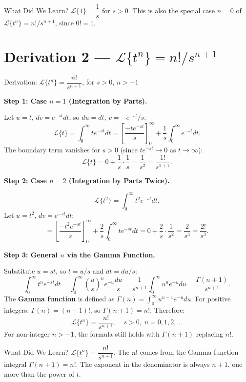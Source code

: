 \documentclass[12pt,a4paper]{article}
\begin{document}
\begin{learnbox}{What Did We Learn?}
$\mathcal{L}\{1\} = \dfrac{1}{s}$ for $s > 0$. This is also the special case $n = 0$ of
$\mathcal{L}\{t^n\} = n!/s^{n+1}$, since $0! = 1$.
\end{learnbox}

\section{Derivation 2 --- \texorpdfstring{$\mathcal{L}\{t^n\} = n!/s^{n+1}$}{L{tn}}}

\begin{infobox}{Derivation: $\mathcal{L}\{t^n\} = \dfrac{n!}{s^{n+1}}$, for $s > 0$, $n > -1$}

\textbf{Step 1: Case $n = 1$ (Integration by Parts).}

Let $u = t$, $dv = e^{-st} dt$, so $du = dt$, $v = -e^{-st}/s$:
\[
  \mathcal{L}\{t\} = \int_0^\infty t e^{-st} dt
  = \left[ \frac{-t e^{-st}}{s} \right]_0^\infty + \frac{1}{s}\int_0^\infty e^{-st} dt.
\]
The boundary term vanishes for $s > 0$ (since $t e^{-st} \to 0$ as $t \to \infty$):
\[
  \mathcal{L}\{t\} = 0 + \frac{1}{s} \cdot \frac{1}{s} = \frac{1}{s^2} = \frac{1!}{s^{1+1}}.
\]

\textbf{Step 2: Case $n = 2$ (Integration by Parts Twice).}

\[
  \mathcal{L}\{t^2\} = \int_0^\infty t^2 e^{-st} dt.
\]
Let $u = t^2$, $dv = e^{-st}dt$:
\[
  = \left[\frac{-t^2 e^{-st}}{s}\right]_0^\infty + \frac{2}{s}\int_0^\infty t e^{-st} dt
  = 0 + \frac{2}{s} \cdot \frac{1}{s^2} = \frac{2}{s^3} = \frac{2!}{s^3}.
\]

\textbf{Step 3: General $n$ via the Gamma Function.}

Substitute $u = st$, so $t = u/s$ and $dt = du/s$:
\[
  \int_0^\infty t^n e^{-st} dt = \int_0^\infty \left(\frac{u}{s}\right)^n e^{-u} \frac{du}{s}
  = \frac{1}{s^{n+1}} \int_0^\infty u^n e^{-u} du = \frac{\Gamma(n+1)}{s^{n+1}}.
\]
The \textbf{Gamma function} is defined as $\Gamma(n) = \int_0^\infty u^{n-1} e^{-u} du$.
For positive integers: $\Gamma(n) = (n-1)!$, so $\Gamma(n+1) = n!$. Therefore:
\[
  \mathcal{L}\{t^n\} = \frac{n!}{s^{n+1}}, \quad s > 0, \; n = 0, 1, 2, \ldots
\]
For non-integer $n > -1$, the formula still holds with $\Gamma(n+1)$ replacing $n!$.
\end{infobox}

\begin{learnbox}{What Did We Learn?}
$\mathcal{L}\{t^n\} = \dfrac{n!}{s^{n+1}}$. The $n!$ comes from the Gamma function integral
$\Gamma(n+1) = n!$. The exponent in the denominator is always $n+1$, one more than the
power of $t$.
\end{learnbox}
\end{document}

